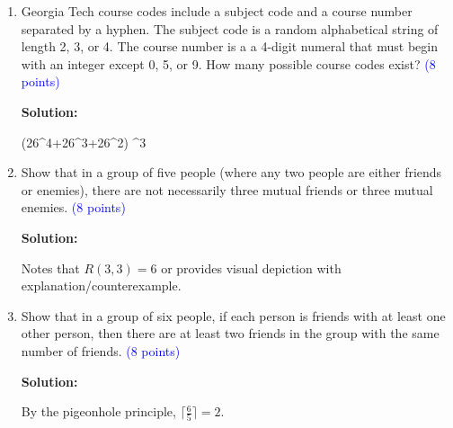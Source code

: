 \documentclass{article}
\newcommand{\pt}[1]{\textcolor{blue}{(#1 points)}}
\newenvironment{solution}
{
\par
\color{blue}
\textbf{Solution:}
}
{
\par
}
\begin{document}
\begin{enumerate}
\begin{solution}
\begin{enumerate}
    \item[(a)] $5^10$
    \item[(b)] $0$
    \item[(c)] $n!$
\end{enumerate}
\end{solution}


\item Georgia Tech course codes include a subject code and a course number separated by a hyphen. The subject code is a random alphabetical string of length 2, 3, or 4. The course number is a a 4-digit numeral that must begin with an integer except 0, 5, or 9. How many possible course codes exist? \pt{8}

\begin{solution}
(26^4+26^3+26^2)  ^3
\end{solution}

\item Show that in a group of five people (where any two people are either friends or enemies), there are not necessarily three mutual friends or three mutual enemies. \pt{8}

\begin{solution}
Notes that $R(3,3)=6$ or provides visual depiction with explanation/counterexample.
\end{solution}

\item Show that in a group of six people, if each person is friends with at least one other person, then there are at least two friends in the group with the same number of friends. \pt{8}

\begin{solution}
By the pigeonhole principle, $\lceil \frac{6}{5} \rceil = 2$.
\end{solution}


\end{enumerate}
\end{document}
